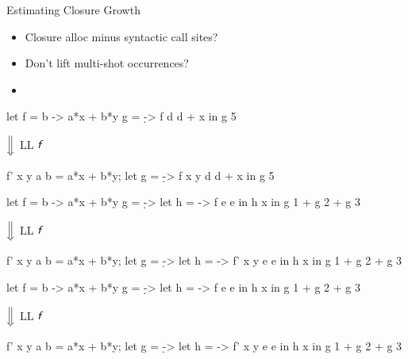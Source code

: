 \documentclass{haskellbeamer}
\newcommand{\id}[1]{\textsf{\textsl{#1}}\xspace}
\newcommand{\idf}{\id{f}}
\begin{document}
\begin{frame}[fragile]{Estimating Closure Growth}
  \begin{center}
    \begin{minipage}{0.45\textwidth}
      \begin{itemize}
        \item<3-> Closure alloc minus syntactic call sites? 
        \item<6-> Don't lift multi-shot occurrences? \only<7->{\xmark}
        \item<6->  
      \end{itemize}
    \end{minipage}%
    \begin{minipage}{0.55\textwidth}
      \begin{overprint}
        \begin{haskell}
          let f = \a b -> a*x + b*y
              g = \d -> f d d + x
          in g 5
        \end{haskell}
        \hspace{0.4\textwidth}$\Big\Downarrow$ LL $\idf$
        \begin{haskell}
          f' x y a b = a*x + b*y;
          let g = \d -> f x y d d + x
          in g 5
        \end{haskell}
        \begin{haskell}
          let f = \a b -> a*x + b*y
              g = \d ->
                let h = \e -> f e e
                in h x
          in g 1 + g 2 + g 3
        \end{haskell}
        \hspace{0.4\textwidth}$\Big\Downarrow$ LL $\idf$
        \begin{haskell}
          f' x y a b = a*x + b*y;
          let g = \d ->
                let h = \e -> f' x y e e
                in h x
          in g 1 + g 2 + g 3
        \end{haskell}
        \begin{haskell}
          let f = \a b -> a*x + b*y
              g = \d ->
                let h = \e -> f e e
                in h x
          in g 1 + g 2 + g 3
        \end{haskell}
        \hspace{0.4\textwidth}$\Big\Downarrow$ LL $\idf$
        \begin{haskell}
          f' x y a b = a*x + b*y;
          let g = \d ->
                let h = \e -> f' x y e e
                in h x
          in g 1 + g 2 + g 3
        \end{haskell}
      \end{overprint}
    \end{minipage}
  \end{center}
\end{frame}
\end{document}
